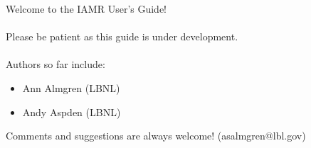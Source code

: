 Welcome to the IAMR User's Guide!\\ \\

\noindent Please be patient as this guide is under development. \\ \\ 

\noindent Authors so far include:

\begin{itemize}
 \item Ann Almgren (LBNL)
 \item Andy Aspden (LBNL)
\end{itemize} 

\noindent Comments and suggestions are always welcome! (asalmgren@lbl.gov)
